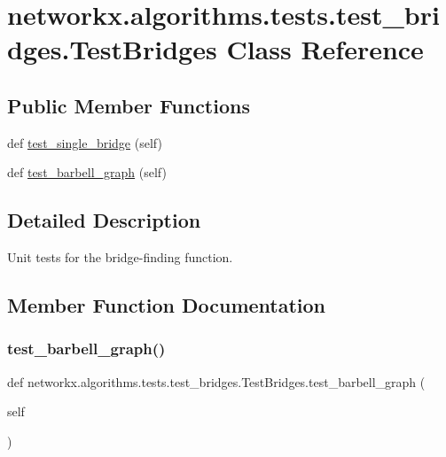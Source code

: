 \hypertarget{classnetworkx_1_1algorithms_1_1tests_1_1test__bridges_1_1TestBridges}{}\section{networkx.\+algorithms.\+tests.\+test\+\_\+bridges.\+Test\+Bridges Class Reference}
\label{classnetworkx_1_1algorithms_1_1tests_1_1test__bridges_1_1TestBridges}
\subsection*{Public Member Functions}
\begin{DoxyCompactItemize}
\item 
def \hyperlink{classnetworkx_1_1algorithms_1_1tests_1_1test__bridges_1_1TestBridges_a360861e27147b81bab64b943b5390ab6}{test\+\_\+single\+\_\+bridge} (self)
\item 
def \hyperlink{classnetworkx_1_1algorithms_1_1tests_1_1test__bridges_1_1TestBridges_a49486c51375bcfddb8ccd77379124bd3}{test\+\_\+barbell\+\_\+graph} (self)
\end{DoxyCompactItemize}


\subsection{Detailed Description}
\begin{DoxyVerb}Unit tests for the bridge-finding function.\end{DoxyVerb}
 

\subsection{Member Function Documentation}
\mbox{\label{classnetworkx_1_1algorithms_1_1tests_1_1test__bridges_1_1TestBridges_a49486c51375bcfddb8ccd77379124bd3}} 
\subsubsection{\texorpdfstring{test\+\_\+barbell\+\_\+graph()}{test\_barbell\_graph()}}
{\footnotesize\ttfamily def networkx.\+algorithms.\+tests.\+test\+\_\+bridges.\+Test\+Bridges.\+test\+\_\+barbell\+\_\+graph (\begin{DoxyParamCaption}\item[{}]{self }\end{DoxyParamCaption})}

